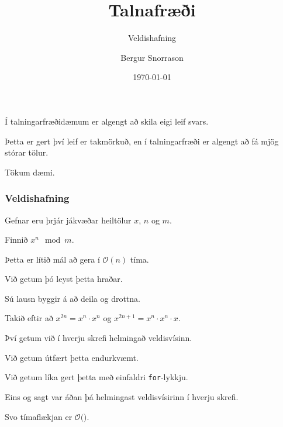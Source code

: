 \title{Talnafræði}
\subtitle{Veldishafning}
\author{Bergur Snorrason}
\date{\today}



\frame{\titlepage}

{
	{
		\item<1-> Í talningarfræðidæmum er algengt að skila eigi leif svars.
		\item<2-> Þetta er gert því leif er takmörkuð, en í talningarfræði er algengt að fá mjög stórar tölur.
		\item<3-> Tökum dæmi.
	}
}

{
	\frametitle{Veldishafning}
	{
		\item<1-> Gefnar eru þrjár jákvæðar heiltölur $x$, $n$ og $m$.
		\item<2-> Finnið $x^n \mod m$.
	}
}

{
	{
		\item<1-> Þetta er lítið mál að gera í $\mathcal{O}(n)$ tíma.
		\item<2->[] 
		\item<3-> Við getum þó leyst þetta hraðar.
		\item<4-> Sú lausn byggir á að deila og drottna.
		\item<5-> Takið eftir að $x^{2n} = x^n \cdot x^n$ og $x^{2n + 1} = x^n \cdot x^n \cdot x$.
		\item<6-> Því getum við í hverju skrefi helmingað veldisvísinn.
	}
}

{
	{
		\item<1-> Við getum útfært þetta endurkvæmt.
		\item<2->[] 
		\item<3-> Við getum líka gert þetta með einfaldri \texttt{for}-lykkju.
		\item<4->[] 
	}
}

{
	{
		\item<1-> Eins og sagt var áðan þá helmingast veldisvísirinn í hverju skrefi.
		\item<2-> Svo tímaflækjan er $\mathcal{O}($\onslide<3->{$\log n$}$)$.
	}
}

{
}


